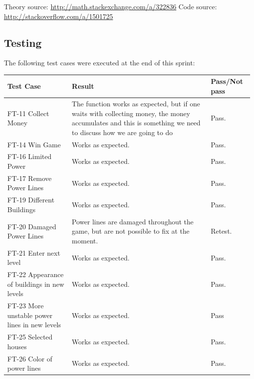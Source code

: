 			Theory source: \url{http://math.stackexchange.com/a/322836} \newline
			Code source: \url{http://stackoverflow.com/a/1501725} \newline

\subsection{Testing}

	The following test cases were executed at the end of this sprint:


	\begin{tabular}{| p{3cm} | p{7cm} | p{2cm} |}
		\hline
		\rowcolor{lightgray}
		{\bf Test Case} & {\bf Result} & {\bf Pass/Not pass} \\ \hline

	  	FT-11 Collect Money & The function works as expected, but if one waits with collecting money, the money accumulates and this is something we need to discuss how we are going to do & Pass. \\ \hline

	  	FT-14 Win Game & Works as expected. & Pass. \\ \hline
	  	
	  	FT-16 Limited Power & Works as expected. & Pass. \\ \hline
	  	
	  	FT-17 Remove Power Lines & Works as expected. & Pass. \\ \hline
	  	
	  	
	  	FT-19 Different Buildings & Works as expected. & Pass. \\ \hline

	  	FT-20 Damaged Power Lines & Power lines are damaged throughout the game, but are not possible 
	  	to fix at the moment. & Retest. \\ \hline
	  	
	  	FT-21 Enter next level & Works as expected. & Pass. \\ \hline

	  	FT-22 Appearance of buildings in new levels & Works as expected. & Pass. \\ \hline

	  	FT-23 More unstable power lines in new levels & Works as expected. & Pass \\ \hline

	  	FT-25 Selected houses & Works as expected. & Pass. \\ \hline

	  	FT-26 Color of power lines & Works as expected. & Pass. \\ \hline

	\end{tabular}

